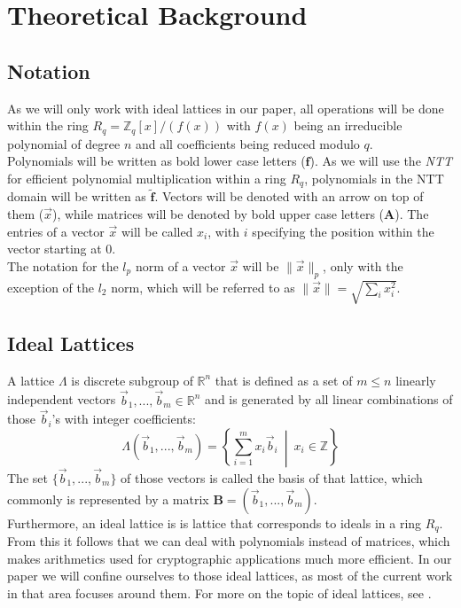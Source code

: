 %
%

\chapter{Theoretical Background}

\section{Notation}
As we will only work with ideal lattices in our paper, all operations will be done within the ring \(R_q=\mathbb{Z}_q[x]/(f(x))\) with \(f(x)\) being an irreducible polynomial of degree \(n\) and all coefficients being reduced modulo \(q\).\\
Polynomials will be written as bold lower case letters (\(\textbf{f}\)). As we will use the \textit{NTT} for efficient polynomial multiplication within a ring \(R_q\), polynomials in the NTT domain will be written as \(\tilde{\textbf{f}}\). Vectors will be denoted with an arrow on top of them (\(\vec{x}\)), while matrices will be denoted by bold upper case letters (\(\textbf{A}\)). The entries of a vector \(\vec{x}\) will be called \(x_i\), with \(i\) specifying the position within the vector starting at 0.\\
The notation for the \(l_p\) norm of a vector \(\vec{x}\) will be \(\|\vec{x}\|_p\), only with the exception of the \(l_2\) norm, which will be referred to as \(\|\vec{x}\|=\sqrt{\sum_{i} x_i^2}\).

\section{Ideal Lattices}
A lattice \(\Lambda\) is discrete subgroup of \(\mathbb{R}^n\) that is defined as a set of \(m \leq n\) linearly independent vectors \(\vec{b}_1,...,\vec{b}_m \in \mathbb{R}^n\) and is generated by all linear combinations of those \(\vec{b}_i\)'s with integer coefficients:
\begin{equation}
	\Lambda(\vec{b}_1,...,\vec{b}_m)=\left \{ \displaystyle \sum_{i=1}^{m} x_i \vec{b}_i \: \middle | \: x_i \in \mathbb{Z} \right \}
\end{equation}
The set \(\{\vec{b}_1,...,\vec{b}_m\}\) of those vectors is called the basis of that lattice, which commonly is represented by a matrix \(\textbf{B}=(\vec{b}_1,...,\vec{b}_m)\).\\
Furthermore, an ideal lattice is is lattice that corresponds to ideals in a ring \(R_q\). From this it follows that we can deal with polynomials instead of matrices, which makes arithmetics used for cryptographic applications much more efficient. In our paper we will confine ourselves to those ideal lattices, as most of the current work in that area focuses around them. For more on the topic of ideal lattices, see \cite{cryptoeprint:2012:230}.

